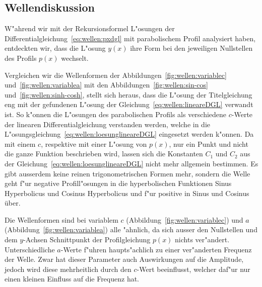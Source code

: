 \subsection{Wellendiskussion}
\label{sec:wellen:diskussionwellenform}
W"ahrend wir mit der Rekursionsformel L"osungen der 
Differentialgleichung~\eqref{eq:wellen:pxdgl} mit parabolischem Profil 
analysiert haben, entdeckten 
wir, dass die L"osung $y(x)$ ihre Form bei den jeweiligen Nullstellen des 
Profils $p(x)$ wechselt.

Vergleichen wir die Wellenformen der Abbildungen~\ref{fig:wellen:variablec} 
und~\ref{fig:wellen:variablea} mit den Abbildungen~\ref{fig:wellen:sin-cos} 
und~\ref{fig:wellen:sinh-cosh}, stellt sich heraus, dass die L"osung der 
Titelgleichung eng mit der gefundenen L"osung der 
Gleichung~\eqref{eq:wellen:lineareDGL} verwandt ist. So k"onnen die L"osungen 
des parabolischen Profils als verschiedene $c$-Werte der linearen 
Differentialgleichung verstanden werden, welche in die 
L"osungsgleichung~\eqref{eq:wellen:loesunglineareDGL} eingesetzt werden 
k"onnen. 
Da mit einem $c$, respektive mit einer L"osung von $p(x)$, nur ein Punkt 
und nicht die ganze Funktion beschrieben wird, lassen sich die Konstanten $C_1$ 
und $C_2$ aus der Gleichung~\eqref{eq:wellen:loesunglineareDGL} nicht mehr 
allgemein bestimmen. Es gibt ausserdem keine reinen trigonometrischen Formen 
mehr, sondern die Welle geht f"ur negative Profill"osungen in die 
hyperbolischen Funktionen Sinus Hyperbolicus und Cosinus Hyperbolicus und f"ur 
positive in Sinus und Cosinus über.

Die Wellenformen sind bei variablem $c$ (Abbildung~\ref{fig:wellen:variablec}) 
und $a$ (Abbildung~\ref{fig:wellen:variablea}) alle "ahnlich, da sich ausser 
den Nullstellen und dem $y$-Achsen Schnittpunkt der Profilgleichung $p(x)$ 
nichts ver"andert. Unterschiedliche $a$-Werte f"uhren haupts"achlich zu einer 
ver"anderten Frequenz der Welle. Zwar hat dieser Parameter auch Auswirkungen 
auf die Amplitude, jedoch wird diese mehrheitlich durch den $c$-Wert 
beeinflusst, welcher daf"ur nur einen kleinen Einfluss auf die Frequenz hat.

